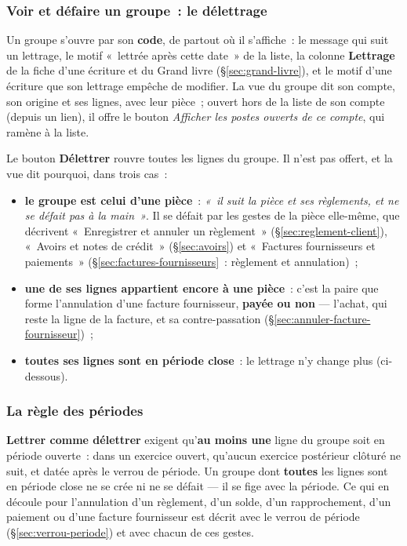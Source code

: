\documentclass[a4paper,11pt,oneside]{article}
\begin{document}
\subsubsection{Voir et défaire un groupe~: le délettrage}

Un groupe s'ouvre par son \textbf{code}, de partout où il s'affiche~: le message qui suit un
lettrage, le motif «~lettrée après cette date~» de la liste, la colonne \textbf{Lettrage} de la
fiche d'une écriture et du Grand livre (\S\ref{sec:grand-livre}), et le motif d'une écriture
que son lettrage empêche de modifier. La vue du groupe dit son compte, son origine et ses
lignes, avec leur pièce~; ouvert hors de la liste de son compte (depuis un lien), il offre le bouton \emph{Afficher les
postes ouverts de ce compte}, qui ramène à la liste.

Le bouton \textbf{Délettrer} rouvre toutes les lignes du groupe. Il n'est pas offert, et la vue
dit pourquoi, dans trois cas~:

\begin{itemize}
    \item \textbf{le groupe est celui d'une pièce}~: \emph{«~il suit la pièce et ses règlements,
          et ne se défait pas à la main~»}. Il se défait par les gestes de la pièce elle-même,
          que décrivent «~Enregistrer et annuler un règlement~» (\S\ref{sec:reglement-client}),
          «~Avoirs et notes de crédit~» (\S\ref{sec:avoirs}) et «~Factures fournisseurs et
          paiements~» (\S\ref{sec:factures-fournisseurs}~: règlement et annulation)~;
    \item \textbf{une de ses lignes appartient encore à une pièce}~: c'est la paire que forme
          l'annulation d'une facture fournisseur, \textbf{payée ou non} --- l'achat, qui reste la
          ligne de la facture, et sa contre-passation (\S\ref{sec:annuler-facture-fournisseur})~;
    \item \textbf{toutes ses lignes sont en période close}~: le lettrage n'y change plus
          (ci-dessous).
\end{itemize}

\subsubsection{La règle des périodes}

\textbf{Lettrer comme délettrer} exigent qu'\textbf{au moins une} ligne du groupe soit en
période ouverte~: dans un exercice ouvert, qu'aucun exercice postérieur clôturé ne suit, et
datée après le verrou de période. Un groupe dont \textbf{toutes} les lignes sont en période
close ne se crée ni ne se défait --- il se fige avec la période. Ce qui en découle pour
l'annulation d'un règlement, d'un solde, d'un rapprochement, d'un paiement ou d'une facture
fournisseur est décrit avec le verrou de période (\S\ref{sec:verrou-periode}) et avec chacun
de ces gestes.
\end{document}
